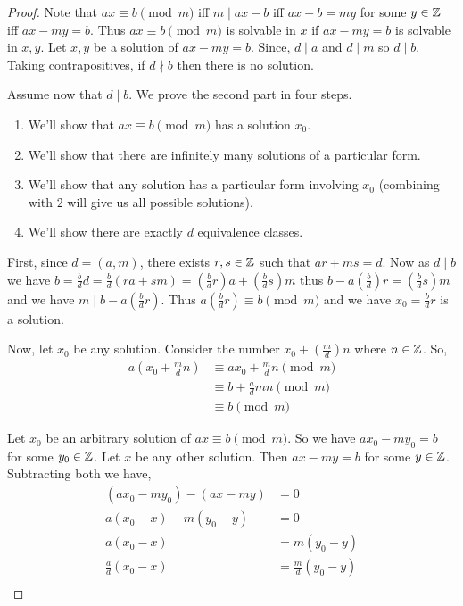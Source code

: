 \begin{proof}
    Note that $ax \equiv b \pmod m$ iff $m \mid ax - b$ iff $ax - b = my$ for some $y \in \mathbb{Z}$ iff $ax - my = b$. Thus  $ax \equiv b \pmod m$ is solvable  in  $x$ if $ax  - my = b$ is solvable in $x,y$. Let $x, y$ be a solution of  $ax - my = b$. Since,  $d \mid a$ and  $d \mid m$ so  $d \mid b$. Taking contrapositives, if  $d \nmid b$  then there is no solution.
    \vspace{1em}

    Assume now that $d \mid b$. We prove  the second part in four steps.
    \begin{enumerate}
        \item We'll show that $ax \equiv b \pmod m$ has a solution  $x_0$.
        \item We'll show that there are infinitely many solutions of a particular form.
        \item We'll show that any solution has a particular form involving $x_0$ (combining with $2$ will give us all possible solutions).
        \item We'll show there are exactly $d$ equivalence classes.
    \end{enumerate}

    First, since $d = (a, m)$, there exists  $r, s \in \mathbb{Z}$ such that  $ar + ms = d$. Now as $d \mid b$ we have  $b = \frac{b}{d} d = \frac{b}{d} (ra + sm) = (\frac{b}{d}r) a + (\frac{b}{d}s) m$ thus $b - a(\frac{b}{d}) r = (\frac{b}{d}s) m$  and we have $m \mid b - a(\frac{b}{d}r)$. Thus $a(\frac{b}{d}r) \equiv b \pmod m$  and we have $x_0 = \frac{b}{d}r$ is a solution.


    \vspace{1em}
    
    Now, let $x_0$ be any solution. Consider the number $x_0 + (\frac{m}{d}) n$ where $n \in \mathbb{Z}$. So,  
    \begin{align*}
        a(x_0 + \frac{m}{d} n) &\equiv ax_0 +  \frac{m}{d}n \pmod m\\
                               &\equiv b + \frac{a}{d} m n \pmod m\\
                               & \equiv b \pmod m
    \end{align*}

    \vspace{1em}

    Let $x_0$ be an arbitrary solution of $ax \equiv b \pmod m$. So we have  $ax_0 - my_0 = b$ for some  $y_0 \in \mathbb{Z}$. Let $x$ be any other solution. Then $ax - my = b$ for some  $y \in \mathbb{Z}$. Subtracting both we have, 
    \begin{align*}
        (ax_0 - my_0) - (ax - my) &= 0\\
        a(x_0 - x) - m(y_0 - y) &= 0\\
        a(x_0 - x) &= m(y_0 - y)\\
        \frac{a}{d}(x_0 - x) &= \frac{m}{d}(y_0 - y)\\
    \end{align*}


\end{proof}
